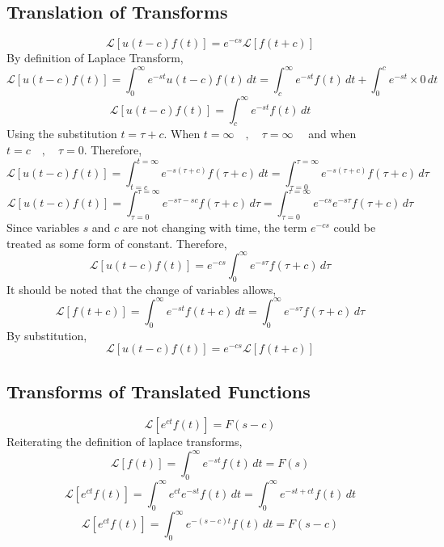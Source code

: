 \documentclass[a4paper, 12pt]{report}
\def\l{\left}
\def\r{\right}
\def\dst{\displaystyle}
\def\lap{\mathcal{L}}
\begin{document}
\begin{center}
\subsection{Translation of Transforms}
$$\lap\l[u(t-c)f(t)\r] = e^{-cs}\lap\l[f(t+c)\r]$$
By definition of Laplace Transform,
$$\lap\l[u(t-c)f(t)\r] = \int^{\infty}_{0}e^{-st}u(t-c)f(t)\,dt = \int^{\infty}_{c}e^{-st}f(t)\,dt + \int^{c}_{0}e^{-st}\times0\,dt$$
$$\lap\l[u(t-c)f(t)\r] = \int^{\infty}_{c}e^{-st}f(t)\,dt$$
Using the substitution $\dst{t = \tau + c}$. When $\dst{t = \infty\quad,\quad \tau = \infty \quad}$ and when $\dst{t = c\quad,\quad \tau = 0}$. Therefore,
$$\lap\l[u(t-c)f(t)\r] = \int^{t = \infty}_{t = c}e^{-s(\tau + c)}f(\tau + c)\,dt = \int^{\tau = \infty}_{\tau = 0}e^{-s(\tau + c)}f(\tau + c)\,d\tau$$
$$\lap\l[u(t-c)f(t)\r] = \int^{\tau = \infty}_{\tau = 0}e^{-s\tau -sc}f(\tau + c)\,d\tau = \int^{\tau = \infty}_{\tau = 0}e^{-cs}e^{-s\tau}f(\tau + c)\,d\tau$$
Since variables $s$ and $c$ are not changing with time, the term $e^{-cs}$ could be treated as some form of constant. Therefore,
$$\lap\l[u(t-c)f(t)\r] = e^{-cs}\int^{\infty}_{0}e^{-s\tau}f(\tau + c)\,d\tau$$
It should be noted that the change of variables allows,
$$\lap\l[f(t+c)\r] = \int^{\infty}_{0}e^{-st}f(t + c)\,dt = \int^{\infty}_{0}e^{-s\tau}f(\tau + c)\,d\tau$$
By substitution,
$$\lap\l[u(t-c)f(t)\r] = e^{-cs}\lap\l[f(t+c)\r]$$
\subsection{Transforms of Translated Functions}
$$\lap[e^{ct}f(t)] = F(s-c)$$
Reiterating the definition of laplace transforms,
$$\lap[f(t)] = \int^{\infty}_{0}e^{-st}f(t)\,dt = F(s)$$
$$\lap[e^{ct}f(t)] = \int^{\infty}_{0}e^{ct}e^{-st}f(t)\,dt = \int^{\infty}_{0}e^{-st + ct}f(t)\,dt$$
$$\lap[e^{ct}f(t)] = \int^{\infty}_{0}e^{-(s-c)t}f(t)\,dt = F(s-c)$$

\end{center}
\end{document}
